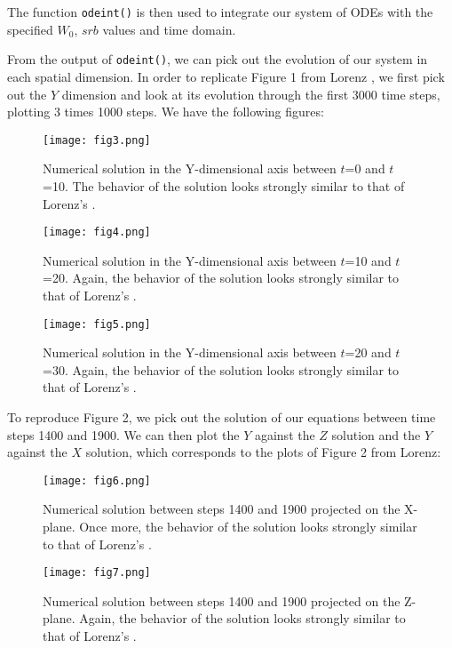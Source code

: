 \documentclass{article}
\begin{document}
The function \texttt{odeint()} is then used to integrate our system of ODEs with the specified $W_0$, $srb$ values and time domain. 

From the output of \texttt{odeint()}, we can pick out the evolution of our system in each spatial dimension. In order to replicate Figure 1 from Lorenz \cite{lorenz_deterministic_1963}, we first pick out the $Y$ dimension and look at its evolution through the first 3000 time steps, plotting 3 times 1000 steps. We have the following figures:

\begin{figure}[h!]
    \centering
	\texttt{[image: fig3.png]}
	\caption{Numerical solution in the Y-dimensional axis between $t$=0 and $t$=10. The behavior of the solution looks strongly similar to that of Lorenz's \cite{lorenz_deterministic_1963}.}
	\label{fig:fig3}
\end{figure}

\begin{figure}[h!]
    \centering
	\texttt{[image: fig4.png]}
	\caption{Numerical solution in the Y-dimensional axis between $t$=10 and $t$=20. Again, the behavior of the solution looks strongly similar to that of Lorenz's \cite{lorenz_deterministic_1963}.}
	\label{fig:fig4}
\end{figure}

\begin{figure}[h!]
    \centering
	\texttt{[image: fig5.png]}
	\caption{Numerical solution in the Y-dimensional axis between $t$=20 and $t$=30. Again, the behavior of the solution looks strongly similar to that of Lorenz's \cite{lorenz_deterministic_1963}.}
	\label{fig:fig5}
\end{figure}

\break

To reproduce Figure 2, we pick out the solution of our equations between time steps 1400 and 1900. We can then plot the $Y$ against the $Z$ solution and the $Y$ against the $X$ solution, which corresponds to the plots of Figure 2 from Lorenz:

\begin{figure}[h!]
    \centering
	\texttt{[image: fig6.png]}
	\caption{Numerical solution between steps 1400 and 1900 projected on the X-plane. Once more, the behavior of the solution looks strongly similar to that of Lorenz's \cite{lorenz_deterministic_1963}.}
	\label{fig:fig6}
\end{figure}

\begin{figure}[h!]
    \centering
	\texttt{[image: fig7.png]}
	\caption{Numerical solution between steps 1400 and 1900 projected on the Z-plane. Again, the behavior of the solution looks strongly similar to that of Lorenz's \cite{lorenz_deterministic_1963}.}
	\label{fig:fig7}
\end{figure}
\end{document}
